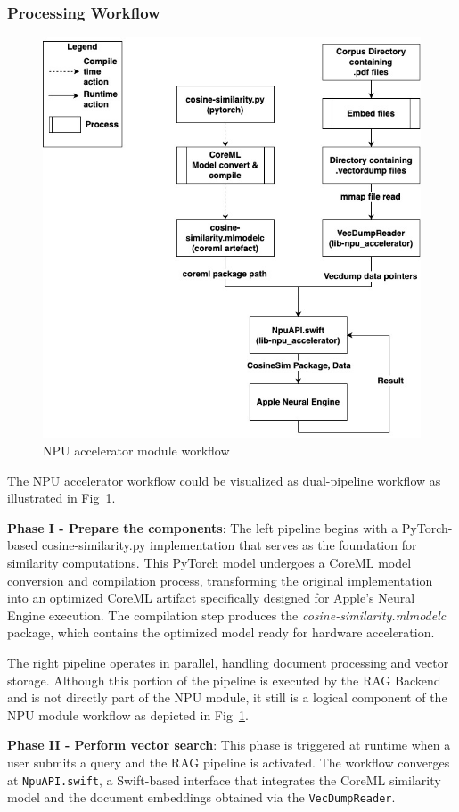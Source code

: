 \subsubsection{Processing Workflow}

\begin{figure}[h]
    \centering
    \includegraphics[width=0.7\linewidth]{images/npu-accelerator-module-worklfow.jpg}
    \caption{NPU accelerator module workflow}
    \label{fig:libnpuworkflow}
\end{figure}
The NPU accelerator workflow could be visualized as  dual-pipeline workflow as illustrated in Fig~\ref{fig:libnpuworkflow}. 

\textbf{Phase I - Prepare the components}:
The left pipeline begins with a PyTorch-based cosine-similarity.py implementation that serves as the foundation for similarity computations. This PyTorch model undergoes a CoreML model conversion and compilation process, transforming the original implementation into an optimized CoreML artifact specifically designed for Apple's Neural Engine execution. The compilation step produces the \textit{cosine-similarity.mlmodelc} package, which contains the optimized model ready for hardware acceleration.

The right pipeline operates in parallel, handling document processing and vector storage. Although this portion of the pipeline is  executed by the RAG Backend and is not directly part of the NPU module, it still is a logical component of the NPU module workflow as depicted in Fig~\ref{fig:libnpuworkflow}.

\textbf{Phase II - Perform vector search}:
This phase is triggered at runtime when a user submits a query and the RAG pipeline is activated. The workflow converges at \texttt{NpuAPI.swift}, a Swift-based interface that integrates the CoreML similarity model and the document embeddings obtained via the \texttt{VecDumpReader}.

